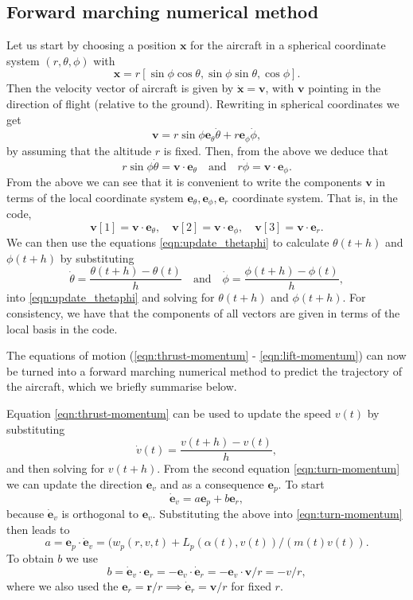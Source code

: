 \documentclass{article}
\renewcommand{\vec}[1]{\boldsymbol{#1}}
\begin{document}
\subsection{Forward marching numerical method}

Let us start by choosing a position $\vec x$ for the aircraft in a spherical coordinate system $(r,\theta,\phi)$ with
\[
\vec x = r [ \sin \phi \cos \theta, \sin \phi \sin \theta,   \cos \phi].
\]
Then the velocity vector of aircraft is given by $\dot{\vec x} = \vec v$, with $\vec v$ pointing in the direction of flight (relative to the ground). Rewriting in spherical coordinates we get
\[
\vec v = r \sin \phi  {\vec e_\theta} \dot \theta + r  {\vec e_\phi} \dot \phi, 
\]
by assuming that the altitude $r$ is fixed. Then, from the above we deduce that
\begin{equation} \label{eqn:update_thetaphi}
    r \sin \phi \dot \theta = \vec v \cdot {\vec e}_\theta  \quad \text{and} \quad 
r \dot \phi = \vec v \cdot {\vec e}_\phi.
\end{equation}
From the above we can see that it is convenient to write the components $\vec v$ in terms of the local coordinate system ${\vec e}_\theta, {\vec e}_\phi, {\vec e}_r$ coordinate system. That is, in the code, 
\[
\vec v[1] = \vec v \cdot {\vec e}_\theta, \quad 
\vec v[2] = \vec v \cdot {\vec e}_\phi, 
\quad 
\vec v[3] = \vec v \cdot {\vec e}_r.
\]
We can then use the equations \eqref{eqn:update_thetaphi}  to calculate $\theta(t+h)$ and $\phi(t+h)$ by substituting 
\[
\dot \theta = \frac{ \theta(t+h) - \theta(t)}{h} \quad \text{and} \quad 
\dot \phi = \frac{ \phi(t+h) - \phi(t)}{h},
\]
into \eqref{eqn:update_thetaphi} and solving for $\theta(t+h)$ and $\phi(t+h)$. For consistency, we have that the components of all vectors are given in terms of the local basis in the code.

The equations of motion (\ref{eqn:thrust-momentum} - \ref{eqn:lift-momentum}) can now be turned into a forward marching numerical method to predict the trajectory of the aircraft, which we briefly summarise below.

Equation \eqref{eqn:thrust-momentum} can be used to update the speed $v(t)$ by substituting
\[
\dot { v}(t) = \frac{{v}(t+h) - {v}(t)}{h},
\]
and then solving for ${v}(t+h)$. From the second equation \eqref{eqn:turn-momentum} we can update the direction $\vec {e}_v$ and as a consequence $\vec e_p$. To start
\[
\dot{\vec e}_v = a {\vec e}_p + b {\vec e}_r, 
\]
because $\dot {\vec e}_v$ is orthogonal to ${\vec e}_v$. Substituting the above into \eqref{eqn:turn-momentum} then leads to
\begin{equation}
 a =  {\vec{e}}_p \cdot \dot{\vec{e}}_v =  (w_p(r,v,t) + L_p(\alpha(t),v(t) ) / (m(t) v(t)).
\end{equation}
To obtain $b$ we use 
\begin{equation}
b = \dot{\vec e}_v \cdot  {\vec e}_r = - {\vec e}_v \cdot  \dot {\vec e}_r =  - {\vec e}_v \cdot  {\vec v} / r = - v / r,    
\end{equation}
where we also used the $\vec e_r = \vec r / r \implies \dot{\vec e}_r = \vec v / r$ for fixed $r$.
\end{document}
